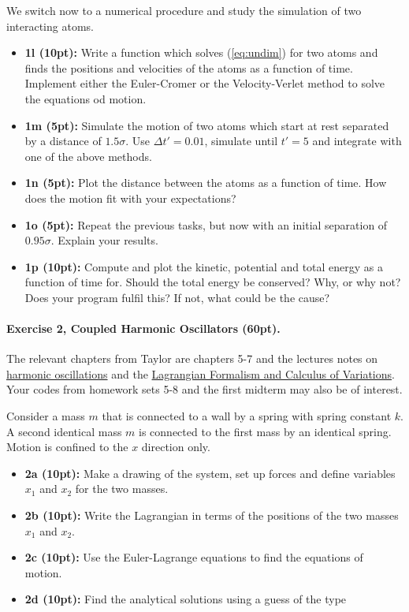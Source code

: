 \documentclass[%
oneside,                 %
final,                   %
10pt]{article}
\begin{document}
\noindent
We switch now to a numerical procedure and study the simulation of two interacting atoms.
\begin{itemize}
\item \textbf{1l (10pt):} Write a function which solves (\ref{eq:undim}) for two atoms and finds the positions and velocities of the atoms as a function of time. Implement either the Euler-Cromer or the Velocity-Verlet method to solve the equations od motion.

\item \textbf{1m (5pt):} Simulate the motion of two atoms which start at rest separated by a distance of ${1.5}\sigma$. Use $\Delta t'={0.01}$, simulate until $t'=5$ and integrate with one of the above methods.

\item \textbf{1n (5pt):} Plot the distance between the atoms as a function of time. How does the motion fit with your expectations?

\item \textbf{1o (5pt):} Repeat the previous tasks, but now with an initial separation of $0.95\sigma$. Explain your results.

\item \textbf{1p (10pt):} Compute and plot the kinetic, potential and total energy as a function of time for. Should the total energy be conserved? Why, or why not? Does your program fulfil this? If not, what could be the cause?
\end{itemize}

\noindent
\paragraph{Exercise 2, Coupled Harmonic Oscillators (60pt).}
The relevant chapters from Taylor are chapters 5-7 and the lectures notes on \href{{https://mhjensen.github.io/Physics321/doc/LectureNotes/_build/html/chapter5.html}}{harmonic oscillations} and the \href{{https://mhjensen.github.io/Physics321/doc/LectureNotes/_build/html/chapter8.html}}{Lagrangian Formalism and Calculus of Variations}. Your codes from homework sets 5-8 and the first midterm may also be of interest.

Consider a mass $m$ that is connected to a wall by a spring with
spring constant $k$. A second identical mass $m$ is connected to the
first mass by an identical spring. Motion is confined to the $x$ direction only.

\begin{itemize}
\item \textbf{2a (10pt):} Make a drawing of the system, set up forces and define variables $x_1$ and $x_2$ for the two masses.

\item \textbf{2b (10pt):} Write the Lagrangian in terms of the positions of the two masses $x_1$ and $x_2$.

\item \textbf{2c (10pt):} Use the Euler-Lagrange equations to find the  equations of motion.

\item \textbf{2d (10pt):} Find the analytical  solutions using a guess of  the type
\end{itemize}
\end{document}

